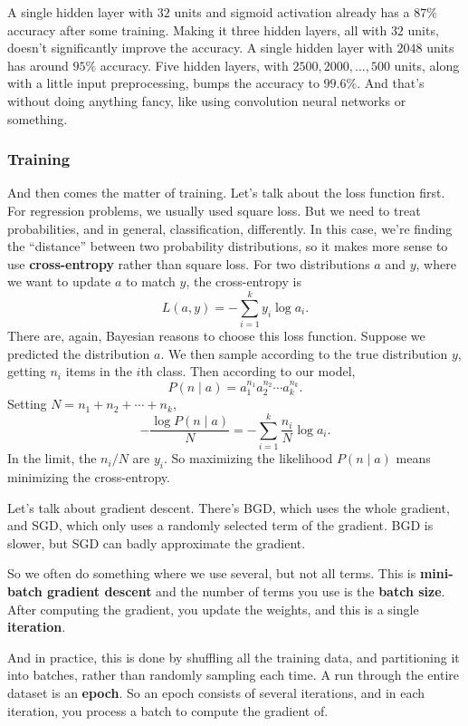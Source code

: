 \documentclass[11pt,paper=letter]{scrartcl}
\begin{document}
A single hidden layer with $32$ units and sigmoid activation already has a $87\%$ accuracy after some training. Making it three hidden layers, all with $32$ units, doesn't significantly improve the accuracy. A single hidden layer with $2048$ units has around $95\%$ accuracy. Five hidden layers, with $2500, 2000, \ldots, 500$ units, along with a little input preprocessing, bumps the accuracy to $99.6\%$. And that's without doing anything fancy, like using convolution neural networks or something.

\subsubsection*{Training}

And then comes the matter of training. Let's talk about the loss function first. For regression problems, we usually used square loss. But we need to treat probabilities, and in general, classification, differently. In this case, we're finding the ``distance'' between two probability distributions, so it makes more sense to use \textbf{cross-entropy} rather than square loss. For two distributions $a$ and $y$, where we want to update $a$ to match $y$, the cross-entropy is
\[
  L(a, y) = -\sum_{i = 1}^k y_i \log a_i.
\]
There are, again, Bayesian reasons to choose this loss function. Suppose we predicted the distribution $a$. We then sample according to the true distribution $y$, getting $n_i$ items in the $i$th class. Then according to our model,
\[
  P(n \mid a) = a_1^{n_1}a_2^{n_2} \cdots a_k^{n_k}.
\]
Setting $N = n_1 + n_2 + \cdots + n_k$,
\[
  -\frac{\log P(n \mid a)}{N}
  = -\sum_{i=1}^k \frac{n_i}{N} \log a_i.
\]
In the limit, the $n_i / N$ are $y_i$. So maximizing the likelihood $P(n \mid a)$ means minimizing the cross-entropy.

Let's talk about gradient descent. There's BGD, which uses the whole gradient, and SGD, which only uses a randomly selected term of the gradient. BGD is slower, but SGD can badly approximate the gradient.

So we often do something where we use several, but not all terms. This is \textbf{mini-batch gradient descent} and the number of terms you use is the \textbf{batch size}. After computing the gradient, you update the weights, and this is a single \textbf{iteration}.

And in practice, this is done by shuffling all the training data, and partitioning it into batches, rather than randomly sampling each time. A run through the entire dataset is an \textbf{epoch}. So an epoch consists of several iterations, and in each iteration, you process a batch to compute the gradient of.
\end{document}
